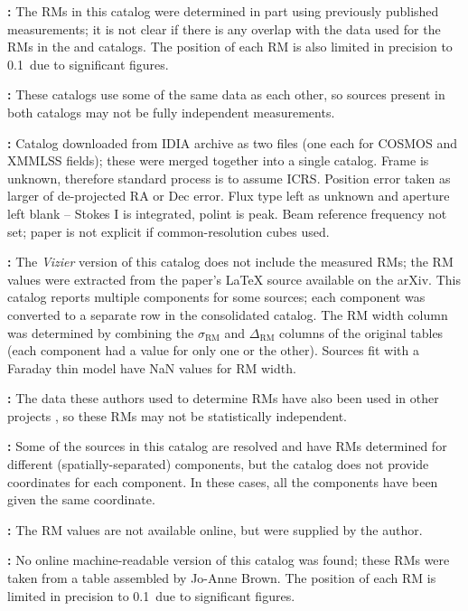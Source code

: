 \documentclass[10pt,modern]{aastex63}
\begin{document}
{\bf \citet{Simard-Normandin1981}:} The RMs in this catalog were determined in part using previously published measurements; it is not clear if there is any overlap with the data used for the RMs in the \citet{Tabara1980} and \citet{Broten1988} catalogs. The position of each RM is also limited in precision to 0.1\degr\ due to significant figures.

{\bf \citet{Riseley2018, Riseley2020}:} These catalogs use some of the same data as each other, so sources present in both catalogs may not be fully independent measurements.

{\bf \citet{Taylor2024}:} Catalog downloaded from IDIA archive as two files (one each for COSMOS and XMMLSS fields); these were merged together into a single catalog. Frame is unknown, therefore standard process is to assume ICRS. Position error taken as larger of de-projected RA or Dec error. Flux type left as unknown and aperture left blank -- Stokes I is integrated, polint is peak. Beam reference frequency not set; paper is not explicit if common-resolution cubes used.  

{\bf \citet{OSullivan2017}:} The {\it Vizier} version of this catalog does not include the measured RMs; the RM values were extracted from the paper's LaTeX source available on the arXiv. This catalog reports multiple components for some sources; each component was converted to a separate row in the consolidated catalog. The RM width column was determined by combining the $\sigma_\mathrm{RM}$ and $\Delta_\mathrm{RM}$ columns of the original tables (each component had a value for only one or the other). Sources fit with a Faraday thin model have NaN values for RM width.

{\bf \citet{Klein2003}:} The data these authors used to determine RMs have also been used in other projects \citep{Rossetti2008, Farnes2014}, so these RMs may not be statistically independent.

{\bf \citet{Heald09}:} Some of the sources in this catalog are resolved and have RMs determined for different (spatially-separated) components, but the catalog does not provide coordinates for each component. In these cases, all the components have been given the same coordinate.

{\bf \citet{Clarke2001}:} The RM values are not available online, but were supplied by the author.

{\bf \citet{Oren1995}:} No online machine-readable version of this catalog was found; these RMs were taken from a table assembled by Jo-Anne Brown. The position of each RM is limited in precision to 0.1\degr\ due to significant figures.
\end{document}
